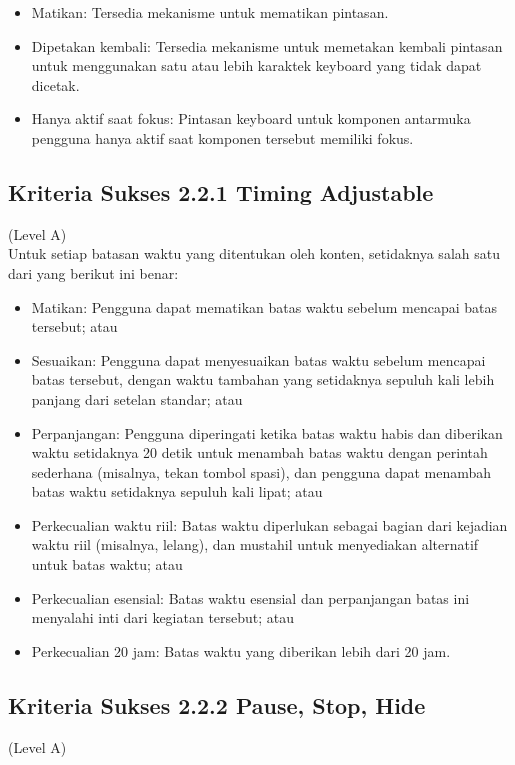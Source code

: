 \begin{itemize}
	\item Matikan: Tersedia mekanisme untuk mematikan pintasan.
	\item Dipetakan kembali: Tersedia mekanisme untuk memetakan kembali pintasan untuk menggunakan satu atau lebih karaktek keyboard yang tidak dapat dicetak.
	\item Hanya aktif saat fokus: Pintasan keyboard untuk komponen antarmuka pengguna hanya aktif saat komponen tersebut memiliki fokus.
\end{itemize}

\subsection{Kriteria Sukses 2.2.1 Timing Adjustable}
\label{subsec:kriteria_2.2.1}
(Level A) \\

Untuk setiap batasan waktu yang ditentukan oleh konten, setidaknya salah satu dari yang berikut ini benar:

\begin{itemize}
	\item Matikan: Pengguna dapat mematikan batas waktu sebelum mencapai batas tersebut; atau
	\item Sesuaikan: Pengguna dapat menyesuaikan batas waktu sebelum mencapai batas tersebut, dengan waktu tambahan yang setidaknya sepuluh kali lebih panjang dari setelan standar; atau
	\item Perpanjangan: Pengguna diperingati ketika batas waktu habis dan diberikan waktu setidaknya 20 detik untuk menambah batas waktu dengan perintah sederhana (misalnya, tekan tombol spasi), dan pengguna dapat menambah batas waktu setidaknya sepuluh kali lipat; atau
	\item Perkecualian waktu riil: Batas waktu diperlukan sebagai bagian dari kejadian waktu riil (misalnya, lelang), dan mustahil untuk menyediakan alternatif untuk batas waktu; atau
	\item Perkecualian esensial: Batas waktu esensial dan perpanjangan batas ini menyalahi inti dari kegiatan tersebut; atau
	\item Perkecualian 20 jam: Batas waktu yang diberikan lebih dari 20 jam.
\end{itemize}

\subsection{Kriteria Sukses 2.2.2 Pause, Stop, Hide}
\label{subsec:kriteria_2.2.2}
(Level A) \\

